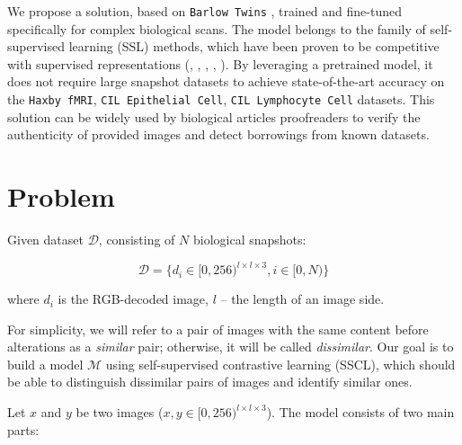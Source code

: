 \documentclass{article}
\begin{document}
We propose a solution, based on \texttt{Barlow Twins} \cite{zbontar2021barlow},
trained and fine-tuned specifically for complex biological scans. 
The model belongs to the family of self-supervised learning (SSL) 
methods, which have been proven to be competitive with supervised representations 
(\cite{chen2020simclr}, \cite{radford2021clip}, \cite{zbontar2021barlow}, \cite{melekhov2016}, 
\cite{grill2020approach_ssl}). By leveraging a pretrained model, 
it does not require large snapshot datasets to achieve state-of-the-art accuracy 
on the \texttt{Haxby fMRI}, \texttt{CIL Epithelial Cell}, 
\texttt{CIL Lymphocyte Cell} datasets. This solution can be widely used by 
biological articles proofreaders to verify the authenticity of provided images and 
detect borrowings from known datasets. 



\section{Problem}\label{sec:problem}

Given dataset $\mathcal{D}$, consisting of $N$ biological snapshots: 

$$ \mathcal{D} = \{d_i \in [0, 256)^{l \times l \times 3}, i \in [0, N)\} $$

where $d_i$ is the RGB-decoded image, $l$ -- the length of an image side. 

For simplicity, we will refer to a pair of images with the same content 
before alterations as a \textit{similar} pair; otherwise, it will be called \textit{dissimilar}.
Our goal is to build a model $\mathcal{M}$ using self-supervised contrastive learning (SSCL), 
which should be able to distinguish dissimilar pairs of images and identify similar ones. 

Let $x$ and $y$ be two images ($x, y \in [0, 256)^{l \times l \times 3}$).
The model consists of two main parts:
\end{document}
